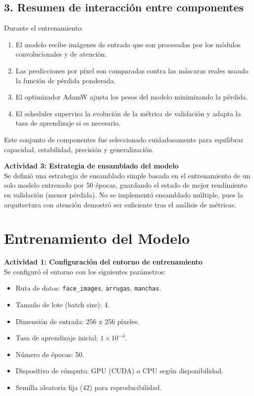 \subsection*{3. Resumen de interacción entre componentes}
Durante el entrenamiento:
\begin{enumerate}
\item El modelo recibe imágenes de entrada que son procesadas por los módulos convolucionales y de atención.
\item Las predicciones por píxel son comparadas contra las máscaras reales usando la función de pérdida ponderada.
\item El optimizador AdamW ajusta los pesos del modelo minimizando la pérdida.
\item El scheduler supervisa la evolución de la métrica de validación y adapta la tasa de aprendizaje si es necesario.
\end{enumerate}

Este conjunto de componentes fue seleccionado cuidadosamente para equilibrar capacidad, estabilidad, precisión y generalización.


\textbf{Actividad 3: Estrategia de ensamblado del modelo}\\
Se definió una estrategia de ensamblado simple basada en el entrenamiento de un solo modelo entrenado por 50 épocas, guardando el estado de mejor rendimiento en validación (menor pérdida). No se implementó ensamblado múltiple, pues la arquitectura con atención demostró ser suficiente tras el análisis de métricas.

\section{Entrenamiento del Modelo}

\textbf{Actividad 1: Configuración del entorno de entrenamiento}\\
Se configuró el entorno con los siguientes parámetros:
\begin{itemize}
  \item Ruta de datos: \texttt{face\_images}, \texttt{arrugas}, \texttt{manchas}.  
  \item Tamaño de lote (batch size): 4.  
  \item Dimensión de entrada: 256 x 256 píxeles.  
  \item Tasa de aprendizaje inicial: $1\times10^{-4}$.  
  \item Número de épocas: 50.  
  \item Dispositivo de cómputo: GPU (CUDA) o CPU según disponibilidad.  
  \item Semilla aleatoria fija (42) para reproducibilidad.  
\end{itemize}

